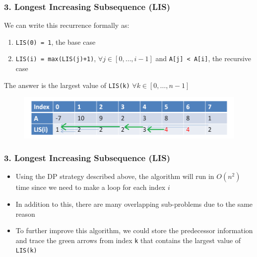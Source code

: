 \documentclass{beamer}
\begin{document}
\begin{frame}[fragile]
\frametitle{3. Longest Increasing Subsequence (LIS)}

We can write this recurrence formally as:

\begin{enumerate}
    \item \verb|LIS(0) = 1|, the base case
    \pause
    \item \verb|LIS(i) = max(LIS(j)+1)|, $\forall j \in [0,\ldots,i-1]$ and \verb|A[j] < A[i]|, the recursive case
\end{enumerate}

\vspace{0.3cm}

\pause
\color{blue}The answer is the largest value of \verb|LIS(k)| $\forall k \in [0,\ldots,n-1]$\color{black}

\begin{figure}
    \centering
    \includegraphics[scale=0.5]{imgs/lis_1.png}
\end{figure}

\end{frame}

\begin{frame}[fragile]
\frametitle{3. Longest Increasing Subsequence (LIS)}

\begin{itemize}
    \item Using the DP strategy described above, the algorithm will run in $O(n^2)$ time since we need to make a loop for each index $i$
    \item In addition to this, there are many overlapping sub-problems due to the same reason
    \item To further improve this algorithm, we could store the predecessor information and trace the green arrows from index \verb|k| that contains the largest value of \verb|LIS(k)|
\end{itemize}

\end{frame}
\end{document}
